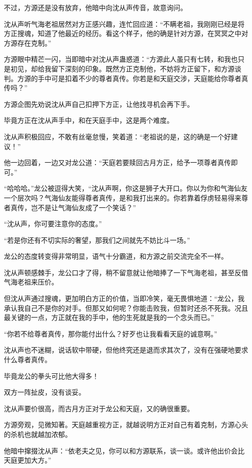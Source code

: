 \begin{this_body}
不过，方源还是没有放弃，他暗中向沈从声传音，故意询问。

沈从声听气海老祖居然对方正感兴趣，连忙回应道：“不瞒老祖，我刚刚已经是将方正搜魂，知道了他最近的经历。看这个样子，他的确是针对方源，在冥冥之中对方源存在克制。”

方源眼中精芒一闪，当即暗中对沈从声蛊惑道：“方源此人虽只有七转，和我也只是初见，却给我留下深刻的印象。既然方正克制他，不妨将方正留下，和方源谈判。方源的手中可是扣着不少的尊者真传。你若是和天庭交涉，天庭能给你尊者真传吗？”

方源企图先劝说沈从声自己扣押下方正，让他找寻机会再下手。

毕竟方正在沈从声手中，和在天庭手中，这是两个难度。

沈从声积极回应，不敢有丝毫怠慢，笑着道：“老祖说的是，这的确是一个好建议！”

他一边回着，一边又对龙公道：“天庭若要赎回古月方正，给予一项尊者真传即可。”

“哈哈哈。”龙公被逗得大笑，“沈从声啊，你这是狮子大开口。你以为你和气海仙友一个层次吗？气海仙友能得尊者真传，是和我打出来的。你若靠着俘虏轻易得来尊者真传，岂不是让气海仙友成了一个笑话？”

“沈从声，你可要注意你的态度。”

“若是你还有不切实际的奢望，那我们之间就先不妨比斗一场。”

龙公的态度转变得非常明显，语气十分霸道，和方源之前交流完全不一样。

沈从声顿感棘手，龙公口才了得，稍不留意就让他暗捧了一下气海老祖，甚至反借气海老祖来压价。

但沈从声通过搜魂，更加明白方正的价值，当即冷笑，毫无畏惧地道：“龙公，我承认我自己不是你的对手。但那又如何呢？你能击败我，但暂时还杀不死我。况且最关键的一点，方正就在我的手中，他的生死就是我的一个念头而已。”

“你若不给尊者真传，那你能付出什么？好歹也让我看看天庭的诚意啊。”

沈从声也不迷糊，说话软中带硬，但他终究还是退而求其次了，没有在强硬地要求什么尊者真传。

毕竟龙公的拳头可比他大得多！

双方一阵扯皮，没有谈妥。

沈从声要价很高，而古月方正对于龙公和天庭，又的确很重要。

方源旁观，见微知著。天庭越重视方正，就越说明方正对自己有着克制，方源心头的杀机也就越加浓郁。

他暗中撺掇沈从声：“依老夫之见，你可以和方源联系，谈一谈。或许他出价会比天庭更加大方。”


\end{this_body}
